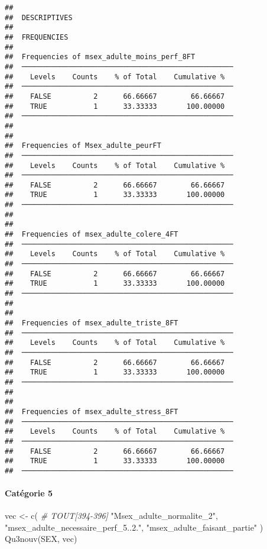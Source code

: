 \documentclass[
]{article}
\newenvironment{Shaded}{\begin{snugshade}}{\end{snugshade}}
\newcommand{\CommentTok}[1]{\textcolor[rgb]{0.56,0.35,0.01}{\textit{#1}}}
\newcommand{\FunctionTok}[1]{\textcolor[rgb]{0.00,0.00,0.00}{#1}}
\newcommand{\NormalTok}[1]{#1}
\newcommand{\OtherTok}[1]{\textcolor[rgb]{0.56,0.35,0.01}{#1}}
\newcommand{\StringTok}[1]{\textcolor[rgb]{0.31,0.60,0.02}{#1}}
\begin{document}
\begin{verbatim}
## 
##  DESCRIPTIVES
## 
##  FREQUENCIES
## 
##  Frequencies of msex_adulte_moins_perf_8FT          
##  ────────────────────────────────────────────────── 
##    Levels    Counts    % of Total    Cumulative %   
##  ────────────────────────────────────────────────── 
##    FALSE          2      66.66667        66.66667   
##    TRUE           1      33.33333       100.00000   
##  ────────────────────────────────────────────────── 
## 
## 
##  Frequencies of Msex_adulte_peurFT                  
##  ────────────────────────────────────────────────── 
##    Levels    Counts    % of Total    Cumulative %   
##  ────────────────────────────────────────────────── 
##    FALSE          2      66.66667        66.66667   
##    TRUE           1      33.33333       100.00000   
##  ────────────────────────────────────────────────── 
## 
## 
##  Frequencies of msex_adulte_colere_4FT              
##  ────────────────────────────────────────────────── 
##    Levels    Counts    % of Total    Cumulative %   
##  ────────────────────────────────────────────────── 
##    FALSE          2      66.66667        66.66667   
##    TRUE           1      33.33333       100.00000   
##  ────────────────────────────────────────────────── 
## 
## 
##  Frequencies of msex_adulte_triste_8FT              
##  ────────────────────────────────────────────────── 
##    Levels    Counts    % of Total    Cumulative %   
##  ────────────────────────────────────────────────── 
##    FALSE          2      66.66667        66.66667   
##    TRUE           1      33.33333       100.00000   
##  ────────────────────────────────────────────────── 
## 
## 
##  Frequencies of msex_adulte_stress_8FT              
##  ────────────────────────────────────────────────── 
##    Levels    Counts    % of Total    Cumulative %   
##  ────────────────────────────────────────────────── 
##    FALSE          2      66.66667        66.66667   
##    TRUE           1      33.33333       100.00000   
##  ──────────────────────────────────────────────────
\end{verbatim}

\hypertarget{catuxe9gorie-5-1}{%
\paragraph{Catégorie 5}\label{catuxe9gorie-5-1}}

\begin{Shaded}
\begin{Highlighting}[]
\NormalTok{vec }\OtherTok{\textless{}{-}} \FunctionTok{c}\NormalTok{(  }\CommentTok{\# TOUT[394{-}396]}
  \StringTok{"Msex\_adulte\_normalite\_2"}\NormalTok{,                             }
  \StringTok{"msex\_adulte\_necessaire\_perf\_5..2."}\NormalTok{,}
  \StringTok{"msex\_adulte\_faisant\_partie"}
\NormalTok{)}
\FunctionTok{Qu3nouv}\NormalTok{(SEX, vec)}
\end{Highlighting}
\end{Shaded}
\end{document}
